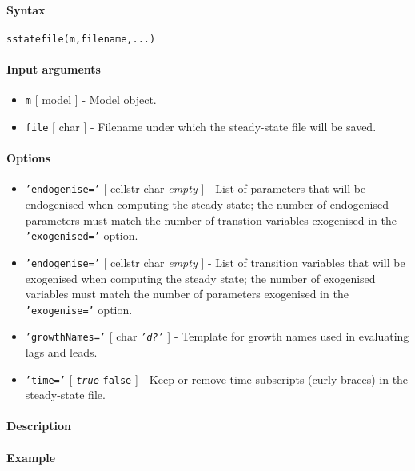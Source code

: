 


	\paragraph{Syntax}\label{syntax}

\begin{verbatim}
sstatefile(m,filename,...)
\end{verbatim}

\paragraph{Input arguments}\label{input-arguments}

\begin{itemize}
\item
  \texttt{m} {[} model {]} - Model object.
\item
  \texttt{file} {[} char {]} - Filename under which the steady-state
  file will be saved.
\end{itemize}

\paragraph{Options}\label{options}

\begin{itemize}
\item
  \texttt{'endogenise='} {[} cellstr \textbar{} char \textbar{}
  \emph{empty} {]} - List of parameters that will be endogenised when
  computing the steady state; the number of endogenised parameters must
  match the number of transtion variables exogenised in the
  \texttt{'exogenised='} option.
\item
  \texttt{'endogenise='} {[} cellstr \textbar{} char \textbar{}
  \emph{empty} {]} - List of transition variables that will be
  exogenised when computing the steady state; the number of exogenised
  variables must match the number of parameters exogenised in the
  \texttt{'exogenise='} option.
\item
  \texttt{'growthNames='} {[} char \textbar{} \emph{\texttt{'d?'}} {]} -
  Template for growth names used in evaluating lags and leads.
\item
  \texttt{'time='} {[} \emph{\texttt{true}} \textbar{} \texttt{false}
  {]} - Keep or remove time subscripts (curly braces) in the
  steady-state file.
\end{itemize}

\paragraph{Description}\label{description}

\paragraph{Example}\label{example}


